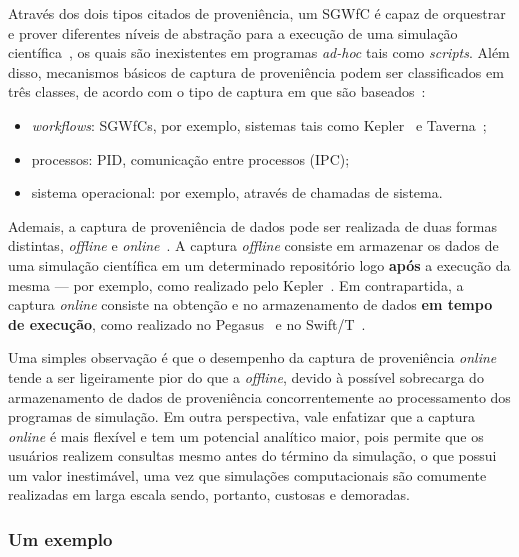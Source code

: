 Através dos dois tipos citados de proveniência, um SGWfC é capaz de orquestrar e prover diferentes níveis de abstração para a execução de uma simulação científica~\cite{murta2014noworkflow}, os quais são inexistentes em programas \textit{ad-hoc} tais como \textit{scripts}. Além disso, mecanismos básicos de captura de proveniência podem ser classificados em três classes, de acordo com o tipo de captura em que são baseados~\cite{freire2008provenance}:

\begin{itemize}
    \item \textit{workflows}: SGWfCs, por exemplo, sistemas tais como Kepler~\cite{ludascher2006scientific} e Taverna~\cite{hull2006taverna};
    \item processos: PID, comunicação entre processos (IPC);
    \item sistema operacional: por exemplo, através de chamadas de sistema.
\end{itemize}

Ademais, a captura de proveniência de dados pode ser realizada de duas formas distintas, \textit{offline} e \textit{online}~\cite{silva2015propostadoutorado}. A captura \textit{offline} consiste em armazenar os dados de uma simulação científica em um determinado repositório logo \textbf{após} a execução da mesma --- por exemplo, como realizado pelo Kepler~\cite{ludascher2006scientific}. Em contrapartida, a captura \textit{online} consiste na obtenção e no armazenamento de dados \textbf{em tempo de execução}, como realizado no Pegasus~\cite{deelman2005pegasus} e no Swift/T~\cite{zhao2007swift}.

Uma simples observação é que o desempenho da captura de proveniência \textit{online} tende a ser ligeiramente pior do que a \textit{offline}, devido à possível sobrecarga do armazenamento de dados de proveniência concorrentemente ao processamento dos programas de simulação. Em outra perspectiva, vale enfatizar que a captura \textit{online} é mais flexível e tem um potencial analítico maior, pois permite que os usuários realizem consultas mesmo antes do término da simulação, o que possui um valor inestimável, uma vez que simulações computacionais são comumente realizadas em larga escala sendo, portanto, custosas e demoradas.

\subsubsection{Um exemplo}

